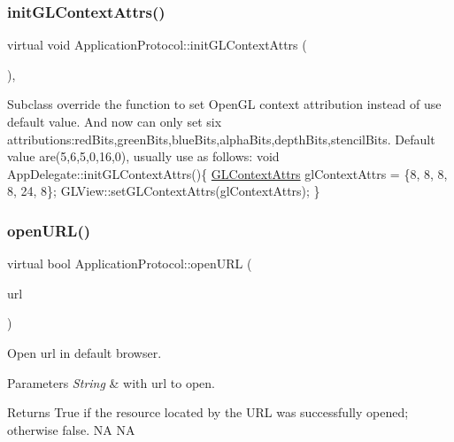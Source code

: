\subsubsection{\texorpdfstring{init\+G\+L\+Context\+Attrs()}{initGLContextAttrs()}\hspace{0.1cm}{\footnotesize\ttfamily [2/2]}}
{\footnotesize\ttfamily virtual void Application\+Protocol\+::init\+G\+L\+Context\+Attrs (\begin{DoxyParamCaption}{ }\end{DoxyParamCaption})\hspace{0.3cm}{\ttfamily [inline]}, {\ttfamily [virtual]}}

Subclass override the function to set Open\+GL context attribution instead of use default value. And now can only set six attributions\+:red\+Bits,green\+Bits,blue\+Bits,alpha\+Bits,depth\+Bits,stencil\+Bits. Default value are(5,6,5,0,16,0), usually use as follows\+: void App\+Delegate\+::init\+G\+L\+Context\+Attrs()\{ \hyperlink{structGLContextAttrs}{G\+L\+Context\+Attrs} gl\+Context\+Attrs = \{8, 8, 8, 8, 24, 8\}; G\+L\+View\+::set\+G\+L\+Context\+Attrs(gl\+Context\+Attrs); \} \mbox{\label{classApplicationProtocol_a152a977b301a90253ec5a6533b2e8e04}} 
\subsubsection{\texorpdfstring{open\+U\+R\+L()}{openURL()}\hspace{0.1cm}{\footnotesize\ttfamily [1/2]}}
{\footnotesize\ttfamily virtual bool Application\+Protocol\+::open\+U\+RL (\begin{DoxyParamCaption}\item[{const std\+::string \&}]{url }\end{DoxyParamCaption})\hspace{0.3cm}{\ttfamily [pure virtual]}}



Open url in default browser. 


\begin{DoxyParams}{Parameters}
{\em String} & with url to open. \\
\hline
\end{DoxyParams}
\begin{DoxyReturn}{Returns}
True if the resource located by the U\+RL was successfully opened; otherwise false.  NA  NA 
\end{DoxyReturn}


